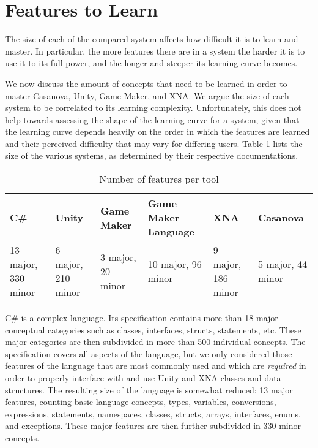 \section{Features to Learn}
The size of each of the compared system affects how difficult it is to learn and master. In particular, the more features there are in a system the harder it is to use it to its full power, and the longer and steeper its learning curve becomes.

We now discuss the amount of concepts that need to be learned in order to master Casanova, Unity, Game Maker, and XNA. We argue the size of each system to be correlated to its learning complexity. Unfortunately, this does not help towards assessing the shape of the learning curve for a system, given that the learning curve depends heavily on the order in which the features are learned and their perceived difficulty that may vary for differing users. Table \ref{table:systems_size} lists the size of the various systems, as determined by their respective documentations.

\begin{table}[ht]
\centering
\begin{tabular}{ | p{2.0cm} | p{2.0cm} | p{2.0cm} | p{2.0cm} | p{2.0cm} | p{2.0cm} | }
   \hline
   C\# & Unity & Game Maker & Game Maker Language & XNA & Casanova \\
   \hline
   13 major, 330 minor & 6 major, 210 minor & 3 major, 20 minor & 10 major, 96 minor & 9 major, 186 minor &    5 major, 44 minor \\
   \hline
\end{tabular}
\label{table:systems_size}
\caption{Number of features per tool}
\end{table}

C\# is a complex language. Its specification \cite{CHAPTER_8_CSHARP_SPECIFICATION} contains more than 18 major conceptual categories such as classes, interfaces, structs, statements, etc. These major categories are then subdivided in more than 500 individual concepts. The specification covers all aspects of the language, but we only considered those features of the language that are most commonly used and which are \textit{required} in order to properly interface with and use Unity and XNA classes and data structures. The resulting size of the language is somewhat reduced: 13 major features, counting basic language concepts, types, variables, conversions, expressions, statements, namespaces, classes, structs, arrays, interfaces, enums, and exceptions. These major features are then further subdivided in 330 minor concepts.

